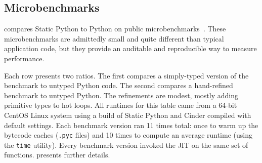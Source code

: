 \documentclass[english,cleveref,crc]{programming}
\newcommand{\SP}{Static Python}
\newcommand{\code}[1]{\texttt{#1}}
\begin{document}


%
%


\subsection{Microbenchmarks}
\label{s:microbenchmarks}

 compares \SP{} to Python on public microbenchmarks~\cite{spbench}.
These microbenchmarks are admittedly small and quite different than typical application code,
but they provide an auditable and reproducible way to measure performance.

Each row presents two ratios.
The first compares a simply-typed version of the benchmark to untyped Python code.
The second compares a hand-refined benchmark to untyped Python.
The refinements are modest, mostly adding primitive types to hot loops.
All runtimes for this table came from a 64-bit CentOS Linux system using a build
of \SP{} and Cinder compiled with default settings.
Each benchmark version ran 11 times total: once to warm up the bytecode caches
(\code{.pyc} files) and 10 times to compute an average runtime (using the
\code{time} utility).
Every benchmark version invoked the JIT on the same set of functions.
 presents further details.
\end{document}
